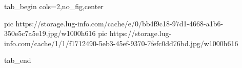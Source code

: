  
 
 
 
 


\ifcmt
  tab_begin cols=2,no_fig,center

     pic https://storage.lug-info.com/cache/e/0/bb4f9c18-97d1-4668-a1b6-350e5c7a5e19.jpg/w1000h616
		 pic https://storage.lug-info.com/cache/1/1/f1712490-5eb3-45ef-9370-7fefc0dd76bd.jpg/w1000h616

  tab_end
\fi
